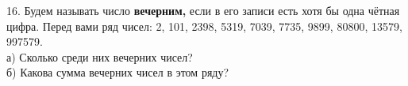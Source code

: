 16. Будем называть число {\bf вечерним,} если в его записи есть хотя бы одна чётная цифра. Перед вами ряд чисел: 2, 101, 2398, 5319, 7039, 7735, 9899, 80800, 13579, 997579.\\
а) Сколько среди них вечерних чисел?\\
б) Какова сумма вечерних чисел в этом ряду?\\
